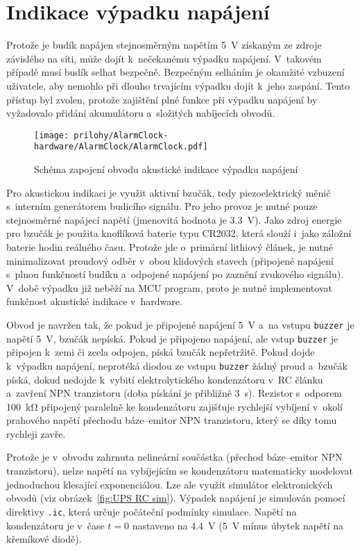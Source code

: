 \section{Indikace výpadku napájení}
Protože je budík napájen stejnosměrným napětím \SI{5}{\volt} získaným ze zdroje
závislého na síti, může dojít k~nečekanému výpadku napájení. V~takovém případě
musí budík selhat bezpečně. Bezpečným selháním je okamžité vzbuzení uživatele,
aby nemohlo při dlouho trvajícím výpadku dojít k~jeho zaspání. Tento přístup
byl zvolen, protože zajištění plné funkce při výpadku napájení by vyžadovalo
přidání akumulátoru a~složitých nabíjecích obvodů.

\begin{figure}
    \centering
    \texttt{[image: prilohy/AlarmClock-hardware/AlarmClock/AlarmClock.pdf]}
    \par\bigskip
    \caption{Schéma zapojení obvodu akustické indikace výpadku napájení}
    \label{fig:UPS sch}
\end{figure}

Pro akustickou indikaci je využit aktivní bzučák, tedy piezoelektrický měnič
s~interním generátorem budicího signálu. Pro jeho provoz je nutné pouze
stejnosměrné napájecí napětí (jmenovitá hodnota je \SI{3,3}{\volt}).
Jako zdroj energie pro bzučák je použita knoflíková baterie typu CR2032, která
slouží i~jako záložní baterie hodin reálného času. Protože jde o~primární
lithiový článek, je nutné minimalizovat proudový odběr v~obou klidových
stavech (připojené napájení s~plnou funkčností budíku a~odpojené napájení po
zaznění zvukového signálu). V~době výpadku již neběží na \acs{MCU} program,
proto je nutné implementovat funkčnost akustické indikace v~hardware.

Obvod je navržen tak, že pokud je připojené napájení \SI{5}{\volt} a~na vstupu
\texttt{buzzer} je napětí \SI{5}{\volt}, bzučák nepíská. Pokud je připojeno
napájení, ale vstup \texttt{buzzer} je připojen k~zemi či zcela odpojen, píská
bzučák nepřetržitě. Pokud dojde k~výpadku napájení, neprotéká diodou ze vstupu
\texttt{buzzer} žádný proud a~bzučák píská, dokud nedojde k~vybití
elektrolytického kondenzátoru v~RC článku a~zavření NPN tranzistoru (doba
pískání je přibližně \SI{3}{\second}). Rezistor s~odporem \SI{100}{\kilo\ohm}
připojený paralelně ke kondenzátoru zajišťuje rychlejší vybíjení v~okolí
prahového napětí přechodu báze--emitor NPN tranzistoru, který se díky tomu
rychleji zavře.

Protože je v~obvodu zahrnuta nelineární součástka (přechod báze--emitor NPN
tranzistoru), nelze napětí na vybíjejícím se kondenzátoru matematicky modelovat
jednoduchou klesající exponenciálou. Lze ale využít simulátor elektronických
obvodů (viz obrázek~\vref{fig:UPS RC sim}). Výpadek napájení je simulován
pomocí direktivy \verb|.ic|, která určuje počáteční podmínky simulace. Napětí
na kondenzátoru je v~čase $t=0$ nastaveno na \SI{4,4}{\volt} (\SI{5}{\volt}
mínus úbytek napětí na křemíkové diodě).

